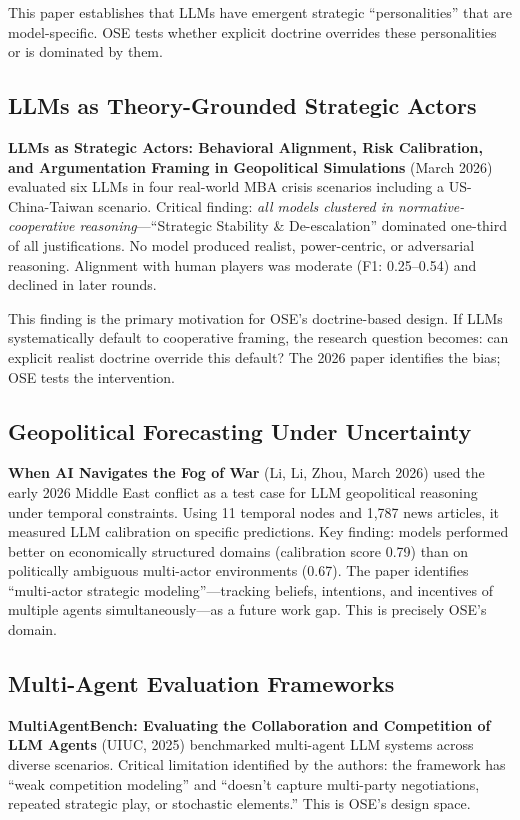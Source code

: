\documentclass[12pt, a4paper]{article}
\begin{document}
This paper establishes that LLMs have emergent strategic ``personalities'' that are model-specific. OSE tests whether explicit doctrine overrides these personalities or is dominated by them.

\subsection{LLMs as Theory-Grounded Strategic Actors}

\textbf{LLMs as Strategic Actors: Behavioral Alignment, Risk Calibration, and Argumentation Framing in Geopolitical Simulations} (March 2026) evaluated six LLMs in four real-world MBA crisis scenarios including a US-China-Taiwan scenario. Critical finding: \textit{all models clustered in normative-cooperative reasoning}---``Strategic Stability \& De-escalation'' dominated one-third of all justifications. No model produced realist, power-centric, or adversarial reasoning. Alignment with human players was moderate (F1: 0.25--0.54) and declined in later rounds.

This finding is the primary motivation for OSE's doctrine-based design. If LLMs systematically default to cooperative framing, the research question becomes: can explicit realist doctrine override this default? The 2026 paper identifies the bias; OSE tests the intervention.

\subsection{Geopolitical Forecasting Under Uncertainty}

\textbf{When AI Navigates the Fog of War} (Li, Li, Zhou, March 2026) used the early 2026 Middle East conflict as a test case for LLM geopolitical reasoning under temporal constraints. Using 11 temporal nodes and 1,787 news articles, it measured LLM calibration on specific predictions. Key finding: models performed better on economically structured domains (calibration score 0.79) than on politically ambiguous multi-actor environments (0.67). The paper identifies ``multi-actor strategic modeling''---tracking beliefs, intentions, and incentives of multiple agents simultaneously---as a future work gap. This is precisely OSE's domain.

\subsection{Multi-Agent Evaluation Frameworks}

\textbf{MultiAgentBench: Evaluating the Collaboration and Competition of LLM Agents} (UIUC, 2025) benchmarked multi-agent LLM systems across diverse scenarios. Critical limitation identified by the authors: the framework has ``weak competition modeling'' and ``doesn't capture multi-party negotiations, repeated strategic play, or stochastic elements.'' This is OSE's design space.
\end{document}
